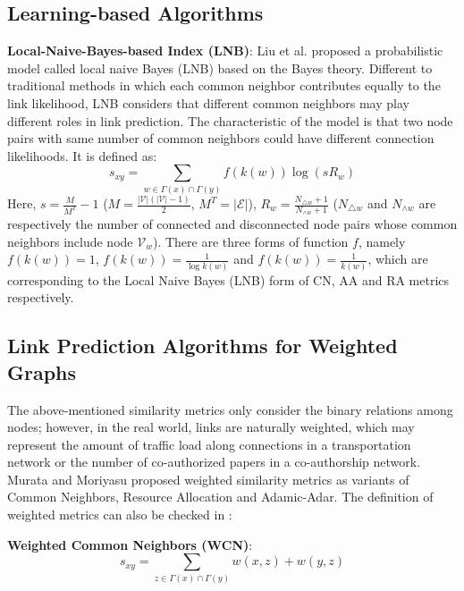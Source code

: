 \documentclass[\main/thesis.tex]{subfiles}
\begin{document}
\subsection{Learning-based Algorithms}
\textbf{Local-Naive-Bayes-based Index (LNB)}: Liu et al. \cite{liu2011link} proposed a probabilistic model called local naive Bayes (LNB) based on the Bayes theory. Different to traditional methods in which each common neighbor contributes equally to the link likelihood, LNB considers that different common neighbors may play different roles in link prediction. The characteristic of the model is that two node pairs with same number of common neighbors could have different connection likelihoods. It is defined as:
\begin{equation}
s_{xy} = \sum_{w\in \Gamma(x)\cap\Gamma(y)}f(k(w))\log(sR_w)
\end{equation}
Here, $s=\frac{M}{M^T}-1$ ($M=\frac{|\mathcal{V}|(|\mathcal{V}|-1)}{2}$, $M^T=|\mathcal{E}|$), $R_w=\frac{N_{\triangle w}+1}{N_{\wedge w}+1}$ ($N_{\triangle w}$ and $N_{\wedge w}$ are respectively the number of connected and disconnected node pairs whose common neighbors include node $\mathcal{V}_w$). There are three forms of function $f$, namely $f(k(w))=1$, $f(k(w))=\frac{1}{\log k(w)}$ and $f(k(w))=\frac{1}{k(w)}$, which are corresponding to the Local Naive Bayes (LNB) form of CN, AA and RA metrics respectively.

\subsection{Link Prediction Algorithms for Weighted Graphs}
The above-mentioned similarity metrics only consider the binary relations among nodes; however, in the real world, links are naturally weighted, which may represent the amount of traffic load along connections in a transportation network or the number of co-authorized papers in a co-authorship network. Murata and Moriyasu \cite{murata2007link} proposed weighted similarity metrics as variants of Common Neighbors, Resource Allocation and Adamic-Adar. The definition of weighted metrics can also be checked in \cite{lu2010link}:

\textbf{Weighted Common Neighbors (WCN)}:
\begin{equation}
s_{xy}=\sum_{z\in \Gamma(x)\cap\Gamma(y)}w(x,z)+w(y,z) \label{WCN-previous}
\end{equation}
\end{document}

